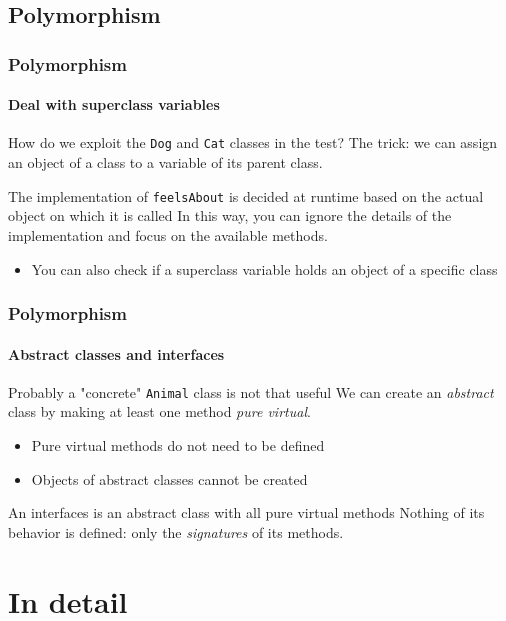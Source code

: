 \subsection{Polymorphism}

\begin{frame}
\frametitle{Polymorphism}
\framesubtitle{Deal with superclass variables}

\begin{block}{How do we exploit the \texttt{Dog} and \texttt{Cat} classes in the test?}
The trick: we can assign an object of a class to a variable of its parent class.
\end{block}
\pause
\begin{block}{The implementation of \texttt{feelsAbout} is decided at runtime based on the actual object on which it is called}
In this way, you can ignore the details of the implementation and focus on the available methods.
\begin{itemize}
\item You can also check if a superclass variable holds an object of a specific class
\end{itemize}
\end{block}

\end{frame}

\begin{frame}
\frametitle{Polymorphism}
\framesubtitle{Abstract classes and interfaces}

\begin{block}{Probably a "concrete" \texttt{Animal} class is not that useful}
We can create an {\em abstract} class by making at least one method {\em pure virtual}.
\begin{itemize}
\item Pure virtual methods do not need to be defined
\item Objects of abstract classes cannot be created
\end{itemize}
\end{block}
\pause
\begin{block}{An interfaces is an abstract class with all pure virtual methods}
Nothing of its behavior is defined: only the {\em signatures} of its methods.
\end{block}

\end{frame}

\section{In detail}

